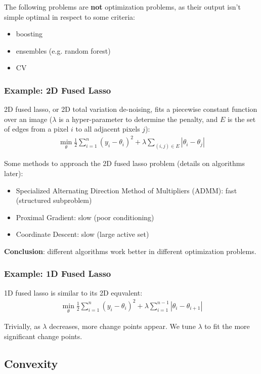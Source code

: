 \documentclass[12pt]{article}
\theoremstyle{definition}
\begin{document}
	The following problems are \textbf{not} optimization problems, as their output isn't simple optimal in respect to some criteria:
	\begin{itemize}
		\item boosting
		\item ensembles (e.g. random forest)
		\item CV
	\end{itemize}
	
	\subsubsection{Example: 2D Fused Lasso}
	2D fused lasso, or 2D total variation de-noising, fits a piecewise constant function over an image ($\lambda$ is a hyper-parameter to determine the penalty, and $E$ is the set of edges from a pixel $i$ to all adjacent pixels $j$):
	\begin{gather*}
		\min_\theta \frac{1}{2} \sum_{i=1}^n (y_i - \theta_i) ^ 2  + \lambda \sum_{(i, j) \in E} |\theta_i - \theta_j|
	\end{gather*}
	
	Some methods to approach the 2D fused lasso problem (details on algorithms later):
	\begin{itemize}
		\item Specialized Alternating Direction Method of Multipliers (ADMM): fast (structured subproblem)
		\item Proximal Gradient: slow (poor conditioning)
		\item Coordinate Descent: slow (large active set)
	\end{itemize}
	
	\textbf{Conclusion}: different algorithms work better in different optimization problems.
	
	\subsubsection{Example: 1D Fused Lasso}
	
	1D fused lasso is similar to its 2D equvalent:
	\begin{gather*}
		\min_\theta \frac{1}{2} \sum_{i=1}^n (y_i - \theta_i) ^ 2  + \lambda \sum_{i=1}^{n - 1} |\theta_i - \theta_{i + 1}|
	\end{gather*}
	
	Trivially, as $\lambda$ decreases, more change points appear. We tune $\lambda$ to fit the more significant change points.
	
	\subsection{Convexity}
	
\end{document}
